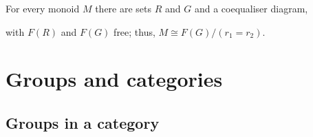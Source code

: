 \documentclass{article}
\begin{document}
\begin{proposition}[Awodey 3.24]
	For every monoid $M$ there are sets $R$ and $G$ and a coequaliser diagram,
	\begin{center}
	\end{center}
	with $F(R)$ and $F(G)$ free; thus, $M\cong F(G)/(r_1=r_2)$.
\end{proposition}

\section{Groups and categories}

\subsection{Groups in a category}
\end{document}
